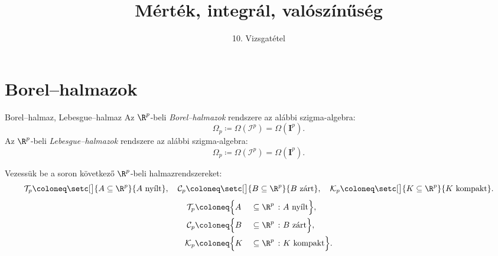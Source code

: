 \documentclass[
]{elteikthesis}[2024/04/26]
\title{Mérték, integrál, valószínűség} %
\subtitle{10. Vizsgatétel}
\begin{document}
	
	
	\section{Borel--halmazok}
	
	\begin{definition}{Borel--halmaz, Lebesgue--halmaz}{}
		Az \( \R^p \)-beli \emph{Borel--halmazok} rendszere az alábbi szigma-algebra:
		\[
			\Omega_p \coloneq \Omega( \mathcal{I}^p ) = \Omega( \mathbf{I}^p ).
		\]
		Az \( \R^p \)-beli \emph{Lebesgue--halmazok} rendszere az alábbi szigma-algebra:
		\[
			\Omega_p \coloneq \Omega( \mathcal{I}^p ) = \Omega( \mathbf{I}^p ).
		\]
	\end{definition}
	
	Vezessük be a soron következő \( \R^p \)-beli halmazrendszereket:
	\[
		\mathcal{T}_p \coloneq \setc[\big]{ A \subseteq \R^p }{ A \text{ nyílt} }, \quad
		\mathcal{C}_p \coloneq \setc[\big]{ B \subseteq \R^p }{ B \text{ zárt} }, \quad
		\mathcal{K}_p \coloneq \setc[\big]{ K \subseteq \R^p }{ K \text{ kompakt} }.
	\]
	\begin{alignat*}{2}
		\mathcal{T}_p &\coloneq \Bigl\{ A &&\subseteq \R^p \ \colon A \text{ nyílt} \Bigr\}, \\
		\mathcal{C}_p &\coloneq \Bigl\{ B &&\subseteq \R^p \ \colon B \text{ zárt} \Bigr\}, \\
		\mathcal{K}_p &\coloneq \Bigl\{ K &&\subseteq \R^p \ \colon K \text{ kompakt} \Bigr\}.
	\end{alignat*}
	
\end{document}
